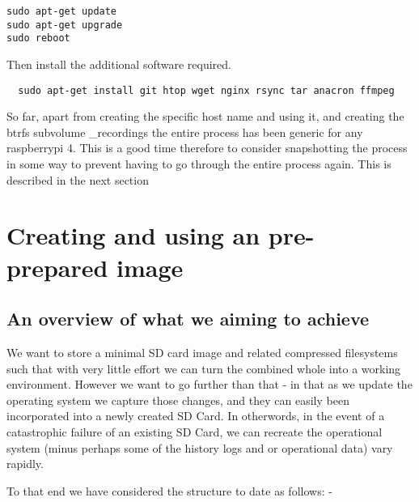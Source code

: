 \documentclass[Draft]{akc}
\begin{document}
\begin{lstlisting}
sudo apt-get update
sudo apt-get upgrade
sudo reboot
\end{lstlisting}


Then install the additional software required.

\begin{lstlisting}
  sudo apt-get install git htop wget nginx rsync tar anacron ffmpeg
\end{lstlisting}

So far, apart from creating the specific host name and using it, and creating
the btrfs subvolume _recordings the entire process has been generic for any
raspberrypi 4.  This is a good time therefore to consider snapshotting the
process in some way to prevent having to go through the entire process again.
This is described in the next section 


\section{Creating and using an pre-prepared image} 
\subsection{An overview of what we aiming to achieve}

We want to store a minimal SD card image and related compressed filesystems such
that with very little effort we can turn the combined whole into a working
environment. However we want to go further than that - in that as we update the
operating system we capture those changes, and they can easily been incorporated
into a newly created SD Card.  In otherwords, in the event of a catastrophic
failure of an existing SD Card, we can recreate the operational system (minus
perhaps some of the history logs and or operational data) vary rapidly.

To that end we have considered the structure to date as follows: -

\end{document}
